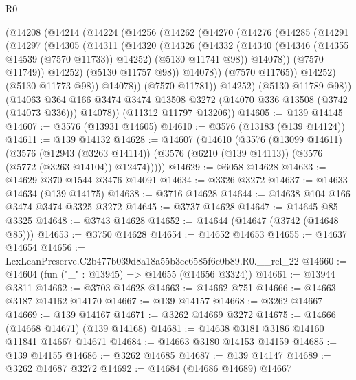 \begin{lexlean}{R0}
\begin{coremodule}
        (@14208
          (@14214
            (@14224
              (@14256
                (@14262
                  (@14270
                    (@14276
                      (@14285
                        (@14291
                          (@14297
                            (@14305
                              (@14311
                                (@14320
                                  (@14326
                                    (@14332
                                      (@14340
                                        (@14346 (@14355 @14539 (@7570 @11733)) @14252)
                                        (@5130 @11741 @98))
                                      @14078))
                                  (@7570 @11749))
                                @14252)
                              (@5130 @11757 @98))
                            @14078))
                        (@7570 @11765))
                      @14252)
                    (@5130 @11773 @98))
                  @14078))
              (@7570 @11781))
            @14252)
          (@5130 @11789 @98))
        (@14063
          @364
          @166
          @3474
          @3474
          @13508
          @3272
          (@14070 @336 @13508 (@3742 (@14073 @336)))
          @14078))
      (@11312 @11797 @13206))
@14605 := @139 @14145
@14607 := @3576 (@13931 @14605)
@14610 := @3576 (@13183 (@139 @14124))
@14611 := @139 @14132
@14628 := @14607
    (@14610
      (@3576
        (@13099 @14611)
        (@3576
          (@12943 (@3263 @14114))
          (@3576 (@6210 (@139 @14113)) (@3576 (@5772 (@3263 @14104)) @12474)))))
@14629 := @6058 @14628
@14633 := @14629 @370 @1544 @3476 @14091
@14634 := @3326 @3272
@14637 := @14633 @14634 (@139 @14175)
@14638 := @3716 @14628
@14644 := @14638 @104 @166 @3474 @3474 @3325 @3272
@14645 := @3737 @14628
@14647 := @14645 @85 @3325
@14648 := @3743 @14628
@14652 := @14644 (@14647 (@3742 (@14648 @85)))
@14653 := @3750 @14628
@14654 := @14652 @14653
@14655 := @14637 @14654
@14656 := LexLeanPreserve.C2b477b039d8a18a55b3ec6585f6c0b89.R0.__rel_22
@14660 := @14604 (fun ("_" : @13945) => @14655 (@14656 @3324))
@14661 := @13944 @3811
@14662 := @3703 @14628
@14663 := @14662 @751
@14666 := @14663 @3187 @14162 @14170
@14667 := @139 @14157
@14668 := @3262 @14667
@14669 := @139 @14167
@14671 := @3262 @14669 @3272
@14675 := @14666 (@14668 @14671) (@139 @14168)
@14681 := @14638 @3181 @3186 @14160 @11841 @14667 @14671
@14684 := @14663 @3180 @14153 @14159
@14685 := @139 @14155
@14686 := @3262 @14685
@14687 := @139 @14147
@14689 := @3262 @14687 @3272
@14692 := @14684 (@14686 @14689) @14667

\end{coremodule}
\end{lexlean}
